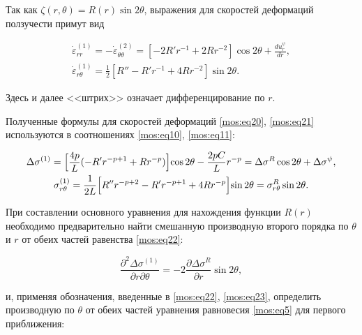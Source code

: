 Так как  $\zeta(r,\theta)=R(r)\sin{2\theta}$, выражения для скоростей деформаций ползучести примут вид

\begin{gather}

\label{mos:eq20}

\dot{\varepsilon}_{rr}^{(1)}=

-\dot{\varepsilon}_{\theta\theta}^{(2)}=[-2R'r^{-1}+2Rr^{-2}]\cos{2\theta}+\frac{du_r^{\psi}}{dr},

\\

\label{mos:eq21}

\dot{\varepsilon}_{r\theta}^{(1)}=\frac12[R''-R'r^{-1}+4Rr^{-2}]\sin{2\theta}.

\end{gather}

Здесь и далее <<штрих>> означает дифференцирование по $r$.



Полученные формулы для скоростей деформаций  \eqref{mos:eq20},  \eqref{mos:eq21} используются в соотношениях  \eqref{mos:eq10}, \eqref{mos:eq11}:

\begin{gather}

\label{mos:eq22}

\Delta\sigma^{(1)}=\Bigl{[}\frac{4p}{L}(-R' r^{-p+1}+Rr^{-p})\Bigl{]}\cos{2\theta}-\frac{2pC}{L}r^{-p}

=\Delta\sigma^R\cos{2\theta}+\Delta\sigma^{\psi},

\\

\label{mos:eq23}

\sigma_{r\theta}^{(1)}=\frac1{2L}\Bigl{[}R'' r^{-p+2}-R' r^{-p+1}+4Rr^{-p}\Bigl{]}\sin{2\theta}=

\sigma_{r\theta}^{R}\sin{2\theta}.

\end{gather}

При составлении основного уравнения для нахождения функции  $ R(r) $ необходимо предварительно найти смешанную производную второго порядка по $\theta$ и $r$ от обеих частей равенства  \eqref{mos:eq22}:

$$ \frac{\partial^2\Delta\sigma^{(1)}}{\partial r\partial \theta}= -2\frac{\partial\Delta\sigma^R}{\partial r}\sin2\theta,$$

и, применяя обозначения, введенные в  \eqref{mos:eq22},  \eqref{mos:eq23}, определить производную по $\theta$ от обеих частей уравнения равновесия  \eqref{mos:eq5} для первого приближения:


